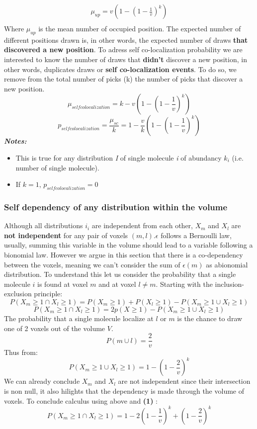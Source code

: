 \documentclass{article}
\begin{document}
\begin{equation}
    \begin{split}
    \mu_{up} = v(1-{(1-\frac{1}{v})}^k) \\
    \end{split}
\end{equation}
Where $\mu_{up}$ is the mean number of occupied position.
The expected number of different positions drawn is, in other words, the expected number of draws \textbf{that discovered a new position}.
To adress self co-localization probability we are interested to know the number of draws that \textbf{didn't} discover a new position,
in other words, duplicates draws or \textbf{self co-localization events}. To do so, we remove from the total number of picks (k) the
number of picks that discover a new position.
\[
\mu_{self colocalization} = k - v(1-(1-\frac{1}{v})^k)
\]
\begin{equation}
p_{self colocalization}  = \frac{\mu_{sc}}{k} = 1 - \frac{v}{k}(1-{(1-\frac{1}{v})}^k)
\end{equation}
\textit{\textbf{Notes:}}
\begin{itemize}
    \item This is true for any distribution \textit{I} of single molecule \textit{i} of abundancy $ k_i $ (i.e. number of single molecule).
    \item If $k = 1$, $p_{self colocalization} = 0$
\end{itemize}

\subsubsection{Self dependency of any distribution within the volume}

Although all distributions $i_i$ are independent from each other, $X_m$ and $X_l$ are \textbf{not independent} for
any pair of voxels $(m,l)$.$\epsilon$ follows a Bernoulli law, usually, summing this variable in the volume should
lead to a variable following a bionomial law. However we argue in this section that there is a co-dependency between
the voxels, meaning we can't consider the sum of $\epsilon (m)$ as abionomial distribution. 
To understand this let us consider the probability that a single molecule $i$ is found at voxel $m$ and at voxel $l \neq m$.
Starting with the inclusion-exclusion principle:
\[
P(X_m \geq 1 \cap X_l \geq 1) = P(X_m \geq 1) + P(X_l \geq 1) - P(X_m\geq 1 \cup X_l\geq 1)
\]
\[
P(X_m \geq 1 \cap X_l \geq 1) = 2p(X \geq 1) - P(X_m\geq 1 \cup X_l\geq 1)
\]
The probability that a single molecule localize at $l$ or $m$ is the chance to draw one of 2 voxels out of the volume $V$.
\[
P(m \cup l) = \frac{2}{v}
\]
Thus from:
\[
P({X_m\geq 1 \cup X_l\geq 1}) = 1 - (1-\frac{2}{v})^{k}
\]
We can already conclude $X_m$ and $X_l$ are not independent since their intersection is non null, it also hilights that the dependency is made through
the volume of voxels. To conclude calculus using above and \textbf{(1)} :
\begin{equation}
    P(X_m \geq 1 \cap X_l \geq 1) =  1 - 2(1-\frac{1}{v})^{k} + (1-\frac{2}{v})^{k} 
\end{equation}
\end{document}

